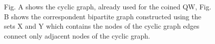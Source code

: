 \begin{figure}[h!]
    \centering   
    \caption{Fig. A shows the cyclic graph, already used for the coined QW, Fig. B shows the correspondent bipartite graph constructed using the sets X and Y which contains the nodes of the cyclic graph
    edges connect only adjacent nodes of the cyclic graph.}
\end{figure}

